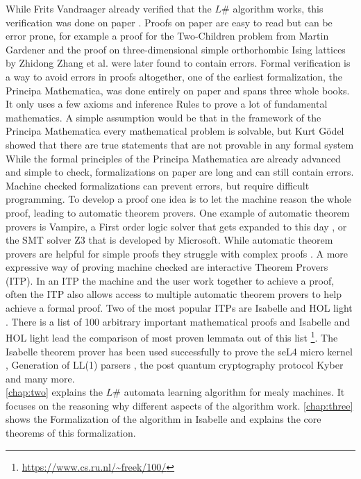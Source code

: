 While Frits Vandraager already verified that the $L\#$ algorithm works, this verification was done on paper \cite{vandraagerlsharp}. Proofs on paper are easy to read but can be error prone, for example a proof for the Two-Children problem from Martin Gardener and the proof on three-dimensional simple orthorhombic Ising lattices by Zhidong Zhang et al. were later found to contain errors\cite{khovanova2011martingardnersmistake, perk2013erroneoussolutionthreedimensional3d}. Formal verification is a way to avoid errors in proofs altogether, one of the earliest formalization, the Principa Mathematica, was done entirely on paper and spans three whole books. It only uses a few axioms and inference Rules to prove a lot of fundamental mathematics. \cite{pincipa} A simple assumption would be that in the framework of the Principa Mathematica every mathematical problem is solvable, but Kurt Gödel showed that there are true statements that are not provable in any formal system \cite{godel}While the formal principles of the Principa Mathematica are already advanced and simple to check, formalizations on paper are long and can still contain errors. Machine checked formalizations can prevent errors, but require difficult programming. To develop a proof one idea is to let the machine reason the whole proof, leading to automatic theorem provers. One example of automatic theorem provers is Vampire, a First order logic solver that gets expanded to this day \cite{vampirediary}, or the SMT solver Z3 that is developed by Microsoft\cite{zthree}. While automatic theorem provers are helpful for simple proofs they struggle with complex proofs \cite{Blaauwbroek_2024}. A more expressive way of proving machine checked are interactive Theorem Provers (ITP). In an ITP the machine and the user work together to achieve a proof, often the ITP also allows access to multiple automatic theorem provers to help achieve a formal proof. Two of the most popular ITPs are Isabelle\cite{paulson2000isabelle700theoremprovers} and HOL light \cite{holligth}. There is a list of 100 arbitrary important mathematical proofs and Isabelle and HOL light lead the comparison of most proven lemmata out of this list \footnote{\url{https://www.cs.ru.nl/~freek/100/}}. The Isabelle theorem prover has been used successfully to prove the seL4 micro kernel \cite{sel4}, Generation of LL(1) parsers \cite{LL1_Parser-AFP}, the post quantum cryptography protocol Kyber \cite{CRYSTALS-Kyber-AFP} and many more.\\
\autoref{chap:two} explains the $L\#$ automata learning algorithm for mealy machines. It focuses on the reasoning why different aspects of the algorithm work. \autoref{chap:three} shows the Formalization of the algorithm in Isabelle and explains the core theorems of this formalization.


